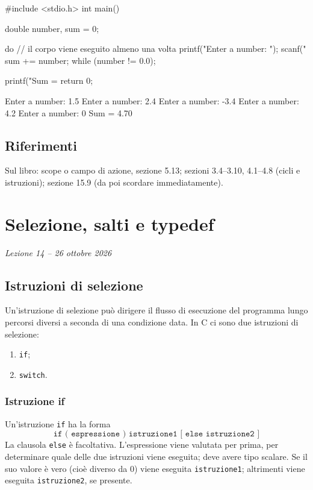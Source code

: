 \documentclass[11pt,a4paper]{article}
\begin{document}
\begin{esempio}
\begin{codice}
#include <stdio.h>
int main()
{
    double number, sum = 0;

    do   // il corpo viene eseguito almeno una volta
    {
        printf("Enter a number: ");
        scanf("%
        sum += number;
    }
    while (number != 0.0);

    printf("Sum = %
    return 0;
}
\end{codice}
\begin{risultato}
Enter a number: 1.5
Enter a number: 2.4
Enter a number: -3.4
Enter a number: 4.2
Enter a number: 0
Sum = 4.70
\end{risultato}
\end{esempio}

\subsection{Riferimenti}

Sul libro: scope o campo di azione, sezione 5.13; sezioni 3.4--3.10, 4.1--4.8 (cicli e istruzioni); sezione 15.9 (da poi scordare immediatamente).

\section[Selezione, salti e typedef (Lezione 14 -- 26 ottobre 2026)]{Selezione, salti e typedef}
\noindent\emph{Lezione 14 -- 26 ottobre 2026}
\subsection{Istruzioni di selezione}

Un'istruzione di selezione può dirigere il flusso di esecuzione del programma lungo percorsi diversi a seconda di una condizione data. In C ci sono due istruzioni di selezione:
\begin{enumerate}
    \item \lstinline|if|;
    \item \lstinline|switch|.
\end{enumerate}

\subsubsection{Istruzione if}

Un'istruzione \lstinline|if| ha la forma
\[
\texttt{if ( espressione ) istruzione1 [ else istruzione2 ]}
\]
La clausola \lstinline|else| è facoltativa. L'espressione viene valutata per prima, per determinare quale delle due istruzioni viene eseguita; deve avere tipo scalare. Se il suo valore è vero (cioè diverso da $0$) viene eseguita \texttt{istruzione1}; altrimenti viene eseguita \texttt{istruzione2}, se presente.
\end{document}
